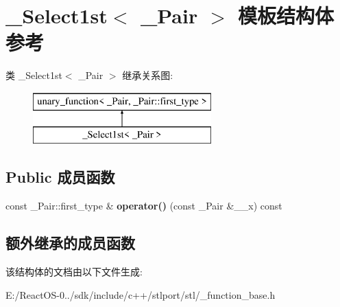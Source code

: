 \hypertarget{struct___select1st}{}\section{\+\_\+\+Select1st$<$ \+\_\+\+Pair $>$ 模板结构体 参考}
\label{struct___select1st}
类 \+\_\+\+Select1st$<$ \+\_\+\+Pair $>$ 继承关系图\+:\begin{figure}[H]
\begin{center}
\leavevmode
\includegraphics[height=2.000000cm]{struct___select1st}
\end{center}
\end{figure}
\subsection*{Public 成员函数}
\begin{DoxyCompactItemize}
\item 
\mbox{\label{struct___select1st_a20852a1107f308b6cb4261be4e64b907}} 
const \+\_\+\+Pair\+::first\+\_\+type \& {\bfseries operator()} (const \+\_\+\+Pair \&\+\_\+\+\_\+x) const
\end{DoxyCompactItemize}
\subsection*{额外继承的成员函数}


该结构体的文档由以下文件生成\+:\begin{DoxyCompactItemize}
\item 
E\+:/\+React\+O\+S-\/0../sdk/include/c++/stlport/stl/\+\_\+function\+\_\+base.\+h\end{DoxyCompactItemize}

